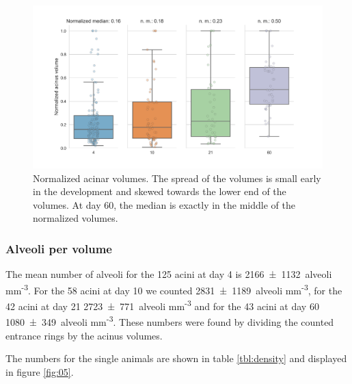 \documentclass[
  american,
]{article}
\begin{document}
\begin{figure}
\hypertarget{fig:04}{%
\centering
\includegraphics{images/fig04.png}
\caption{Normalized acinar volumes.
The spread of the volumes is small early in the development and skewed towards the lower end of the volumes.
At day 60, the median is exactly in the middle of the normalized volumes.}\label{fig:04}
}
\end{figure}

\hypertarget{alveoli-per-volume}{%
\subsubsection{Alveoli per volume}\label{alveoli-per-volume}}

The mean number of alveoli for the 125 acini at day 4 is 2166~±~1132~alveoli mm\textsuperscript{-3}.
For the 58 acini at day 10 we counted 2831~±~1189~alveoli mm\textsuperscript{-3}, for the 42 acini at day 21 2723~±~771~alveoli mm\textsuperscript{-3} and for the 43 acini at day 60 1080~±~349~alveoli mm\textsuperscript{-3}.
These numbers were found by dividing the counted entrance rings by the acinus volumes.

The numbers for the single animals are shown in table \ref{tbl:density} and displayed in figure \ref{fig:05}.
\end{document}
